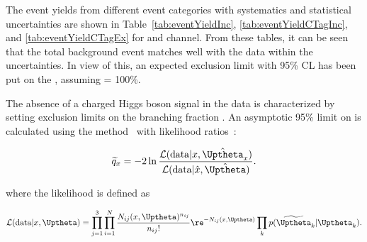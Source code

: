 
The event yields from different event categories with systematics and 
statistical uncertainties are shown in Table~\ref{tab:eventYieldInc},
\ref{tab:eventYieldCTagInc}, and \ref{tab:eventYieldCTagEx} for 
\mujets and \ejets channel. From these tables, it can 
be seen that the total background event matches well with the data 
within the uncertainties. In view of this, an expected exclusion limit 
with 95\% CL has been put on the \brThb, assuming \brHcs = 100\%.

The absence of a charged Higgs boson signal in the 
data is characterized by setting exclusion limits on the branching 
fraction \Bthb. 
An asymptotic 95\% \CL limit on \Bthb is 
calculated using the \CLs method~\cite{Junk:1999kv,Read:2002hq} with
likelihood ratios~\cite{Cowan:2010js}:
\begin{linenomath}
\begin{equation}
    \widetilde{q}_{x} = -2 \ln \frac{\mathcal{L}(\text{data}|x,
    \hat{\Uptheta}_{x})}{\mathcal{L}(\text{data}|\hat{x},\hat{\Uptheta})}.
\end{equation}  
\end{linenomath}
where the likelihood is defined as 
\begin{linenomath}
\begin{equation}
    \mathcal{L}(\text{data}|x,\Uptheta) = \prod_{j=1}^{3}\prod_{i=1}^{N}\frac{N_{ij}(x, 
    \Uptheta)^{n_{ij}}}{n_{ij}!}\re^{-N_{ij}(x, \Uptheta)} \prod_k
    p(\widetilde{\Uptheta}_k|\Uptheta_k).
\label{eq:likelihood}
\end{equation}
\end{linenomath}

